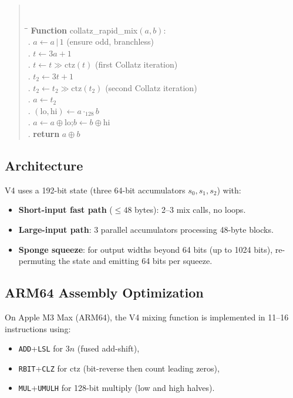 \documentclass[11pt,a4paper]{article}
\newcommand{\ctz}{\mathrm{ctz}}
\begin{document}
\begin{quote}\tt
\begin{tabbing}
\hspace{2em}\=\hspace{2em}\=\kill
\textrm{\textbf{Function}} collatz\_rapid\_mix$(a, b)$:\\
. $a \leftarrow a \,|\, 1$ \textrm{\small (ensure odd, branchless)}\\
. $t \leftarrow 3a + 1$\\
. $t \leftarrow t \gg \ctz(t)$ \textrm{\small (first Collatz iteration)}\\
. $t_2 \leftarrow 3t + 1$\\
. $t_2 \leftarrow t_2 \gg \ctz(t_2)$ \textrm{\small (second Collatz iteration)}\\
. $a \leftarrow t_2$\\
. $(\mathrm{lo}, \mathrm{hi}) \leftarrow a \cdot_{128} b$\\
. $a \leftarrow a \oplus \mathrm{lo}$;\quad $b \leftarrow b \oplus \mathrm{hi}$\\
. \textbf{return} $a \oplus b$
\end{tabbing}
\end{quote}

\subsection{Architecture}

V4 uses a 192-bit state (three 64-bit accumulators $s_0, s_1, s_2$)
with:
\begin{itemize}
    \item \textbf{Short-input fast path} ($\leq 48$ bytes): 2--3 mix
          calls, no loops.
    \item \textbf{Large-input path}: 3 parallel accumulators processing
          48-byte blocks.
    \item \textbf{Sponge squeeze}: for output widths beyond 64 bits (up
          to 1024 bits), re-permuting the state and emitting 64 bits per
          squeeze.
\end{itemize}

\subsection{ARM64 Assembly Optimization}

On Apple M3 Max (ARM64), the V4 mixing function is implemented in 11--16
instructions using:
\begin{itemize}
    \item \texttt{ADD}+\texttt{LSL} for $3n$ (fused add-shift),
    \item \texttt{RBIT}+\texttt{CLZ} for $\ctz$ (bit-reverse then count
          leading zeros),
    \item \texttt{MUL}+\texttt{UMULH} for 128-bit multiply (low and
          high halves).
\end{itemize}
\end{document}
